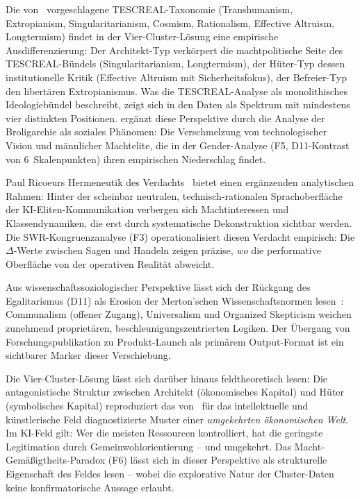 \documentclass[12pt,a4paper]{article}
\begin{document}
Die von~\citet{TorresGebru2024} vorgeschlagene TESCREAL-Taxonomie (Transhumanism, Extropianism, Singularitarianism, Cosmism, Rationalism, Effective Altruism, Longtermism) findet in der Vier-Cluster-Lösung eine empirische Ausdifferenzierung: Der Architekt-Typ verkörpert die machtpolitische Seite des TESCREAL-Bündels (Singularitarianism, Longtermism), der Hüter-Typ dessen institutionelle Kritik (Effective Altruism mit Sicherheitsfokus), der Befreier-Typ den libertären Extropianismus. Was die TESCREAL-Analyse als monolithisches Ideologiebündel beschreibt, zeigt sich in den Daten als Spektrum mit mindestens vier distinkten Positionen. \citet{Becker2025} ergänzt diese Perspektive durch die Analyse der \glqq Broligarchie\grqq{} als soziales Phänomen: Die Verschmelzung von technologischer Vision und männlicher Machtelite, die in der Gender-Analyse (F5, D11-Kontrast von 6~Skalenpunkten) ihren empirischen Niederschlag findet.

Paul Ricoeurs \glqq Hermeneutik des Verdachts\grqq{}~\citep{Ricoeur1970} bietet einen ergänzenden analytischen Rahmen: Hinter der scheinbar neutralen, technisch-rationalen Sprachoberfläche der KI-Eliten-Kommunikation verbergen sich Machtinteressen und Klassendynamiken, die erst durch systematische Dekonstruktion sichtbar werden. Die SWR-Kongruenzanalyse (F3) operationalisiert diesen Verdacht empirisch: Die $\Delta$-Werte zwischen Sagen und Handeln zeigen präzise, \emph{wo} die performative Oberfläche von der operativen Realität abweicht.

Aus wissenschaftssoziologischer Perspektive lässt sich der Rückgang des Egalitarismus (D11) als Erosion der Merton'schen Wissenschaftsnormen lesen~\citep{Merton1973}: Communalism (offener Zugang), Universalism und Organized Skepticism weichen zunehmend proprietären, beschleunigungszentrierten Logiken. Der Übergang von Forschungspublikation zu Produkt-Launch als primärem Output-Format ist ein sichtbarer Marker dieser Verschiebung.

Die Vier-Cluster-Lösung lässt sich darüber hinaus feldtheoretisch lesen: Die antagonistische Struktur zwischen Architekt (ökonomisches Kapital) und Hüter (symbolisches Kapital) reproduziert das von~\citet{Bourdieu1992} für das intellektuelle und künstlerische Feld diagnostizierte Muster einer \emph{umgekehrten ökonomischen Welt}. Im KI-Feld gilt: Wer die meisten Ressourcen kontrolliert, hat die geringste Legitimation durch Gemeinwohlorientierung -- und umgekehrt. Das Macht-Gemäßigtheits-Paradox (F6) lässt sich in dieser Perspektive als strukturelle Eigenschaft des Feldes lesen -- wobei die explorative Natur der Cluster-Daten keine konfirmatorische Aussage erlaubt.
\end{document}
